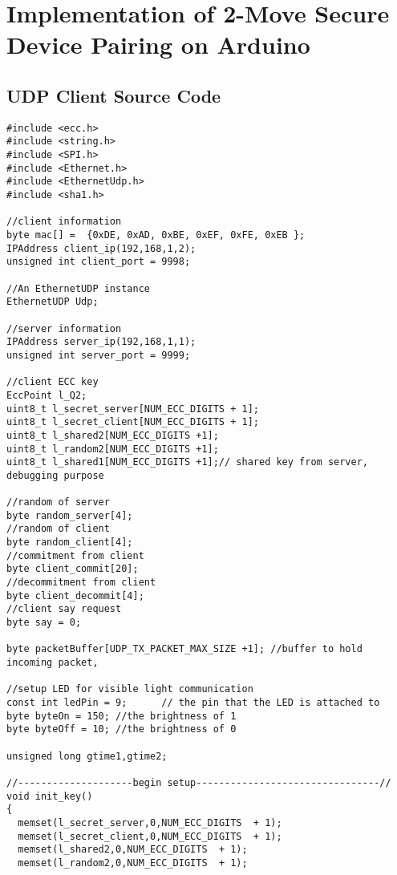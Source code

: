 
\chapter{Implementation of 2-Move Secure Device Pairing on Arduino} %

\label{appC} %

\section{UDP Client Source Code}

{\small 
\begin{Verbatim}[fontsize=\small]
#include <ecc.h>
#include <string.h>
#include <SPI.h>
#include <Ethernet.h>
#include <EthernetUdp.h>
#include <sha1.h>

//client information
byte mac[] =  {0xDE, 0xAD, 0xBE, 0xEF, 0xFE, 0xEB };
IPAddress client_ip(192,168,1,2);
unsigned int client_port = 9998;

//An EthernetUDP instance
EthernetUDP Udp;

//server information
IPAddress server_ip(192,168,1,1);
unsigned int server_port = 9999;

//client ECC key
EccPoint l_Q2;
uint8_t l_secret_server[NUM_ECC_DIGITS + 1];
uint8_t l_secret_client[NUM_ECC_DIGITS + 1];
uint8_t l_shared2[NUM_ECC_DIGITS +1];
uint8_t l_random2[NUM_ECC_DIGITS +1];
uint8_t l_shared1[NUM_ECC_DIGITS +1];// shared key from server, debugging purpose

//random of server
byte random_server[4];
//random of client
byte random_client[4];
//commitment from client
byte client_commit[20];
//decommitment from client
byte client_decommit[4];
//client say request
byte say = 0;

byte packetBuffer[UDP_TX_PACKET_MAX_SIZE +1]; //buffer to hold incoming packet,

//setup LED for visible light communication
const int ledPin = 9;      // the pin that the LED is attached to
byte byteOn = 150; //the brightness of 1
byte byteOff = 10; //the brightness of 0

unsigned long gtime1,gtime2;

//--------------------begin setup--------------------------------//
void init_key()
{
  memset(l_secret_server,0,NUM_ECC_DIGITS  + 1);
  memset(l_secret_client,0,NUM_ECC_DIGITS  + 1);
  memset(l_shared2,0,NUM_ECC_DIGITS  + 1);
  memset(l_random2,0,NUM_ECC_DIGITS  + 1);


\end{Verbatim}}

